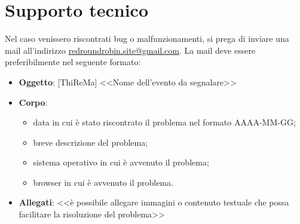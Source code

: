 \section{Supporto tecnico}
Nel caso venissero riscontrati bug o malfunzionamenti, si prega di inviare una mail all'indirizzo \href{mailto:redroundrobin.site@gmail.com}{redroundrobin.site@gmail.com}. La mail deve essere preferibilmente nel seguente formato:
\begin{itemize}
 	\item \textbf{Oggetto}: [ThiReMa] <<Nome dell'evento da segnalare>> 
 	\item \textbf{Corpo}: 
 		\begin{itemize}
 			\item data in cui è stato riscontrato il problema nel formato AAAA-MM-GG;
 			\item breve descrizione del problema;
 			\item sistema operativo in cui è avvenuto il problema;
 			\item browser in cui è avvenuto il problema.
 		\end{itemize}
 	\item \textbf{Allegati}: <<è possibile allegare immagini o contenuto testuale che possa facilitare la risoluzione del problema>>	
 \end{itemize} 